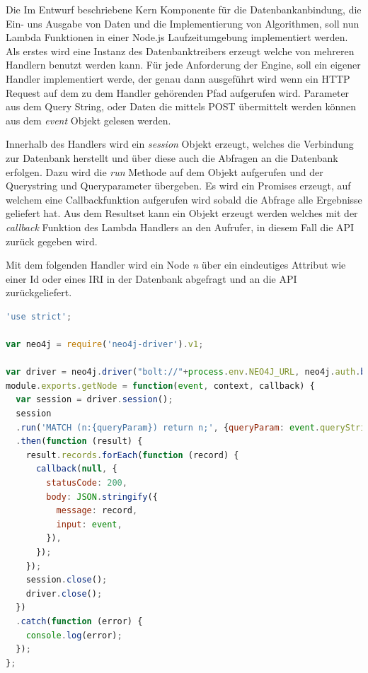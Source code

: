 Die Im Entwurf beschriebene Kern Komponente für die Datenbankanbindung, die Ein- uns Ausgabe von Daten und die Implementierung von Algorithmen, soll nun Lambda Funktionen in einer Node.js Laufzeitumgebung implementiert werden. Als erstes wird eine Instanz des Datenbanktreibers erzeugt welche von mehreren Handlern benutzt werden kann. Für jede Anforderung der Engine, soll ein eigener Handler implementiert werde, der genau dann ausgeführt wird wenn ein HTTP Request auf dem zu dem Handler gehörenden Pfad aufgerufen wird. Parameter aus dem Query String, oder Daten die mittels POST übermittelt werden können aus dem \textit{event} Objekt gelesen werden. 
\newline

Innerhalb des Handlers wird ein \textit{session} Objekt erzeugt, welches die Verbindung zur Datenbank herstellt und über diese auch die Abfragen an die Datenbank erfolgen. Dazu wird die \textit{run} Methode auf dem Objekt aufgerufen und der Querystring und Queryparameter übergeben. Es wird ein Promises erzeugt, auf welchem eine Callbackfunktion aufgerufen wird sobald die Abfrage alle Ergebnisse geliefert hat. Aus dem Resultset kann ein Objekt erzeugt werden welches mit der \textit{callback} Funktion des Lambda Handlers an den Aufrufer, in diesem Fall die API zurück gegeben wird.

Mit dem folgenden Handler wird ein Node \textit{n} über ein eindeutiges Attribut wie einer Id oder eines IRI in der Datenbank abgefragt und an die API zurückgeliefert.


\begin{lstlisting}[language=JavaScript, frame=htrbl, caption={Lambda Handler Funktion}, label={lst:lambda_handler}]
	'use strict';

var neo4j = require('neo4j-driver').v1;

var driver = neo4j.driver("bolt://"+process.env.NEO4J_URL, neo4j.auth.basic("user" ,"password"));
module.exports.getNode = function(event, context, callback) {
  var session = driver.session();
  session
  .run('MATCH (n:{queryParam}) return n;', {queryParam: event.queryStringParameters.label})
  .then(function (result) {
    result.records.forEach(function (record) {
      callback(null, {
        statusCode: 200,
        body: JSON.stringify({
          message: record,
          input: event,
        }),
      });
    });
    session.close();
    driver.close();
  })
  .catch(function (error) {
    console.log(error);
  });
};


\end{lstlisting}


